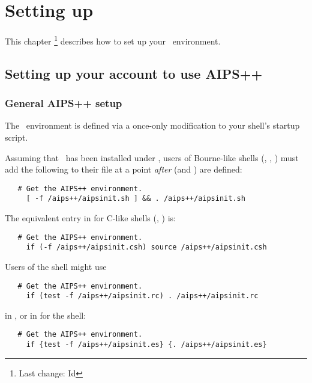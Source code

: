 \chapter{Setting up}
\label{Setting up}

This chapter \footnote{Last change:
$ $Id$ $}
describes how to set up your \aipspp\ environment.


\section{Setting up your account to use AIPS++}
\label{Setup}


\subsection{General AIPS++ setup}

The \aipspp\ environment is defined via a once-only modification to your
shell's startup script.

Assuming that \aipspp\ has been installed under , users of
Bourne-like shells (, , ) must add the
following to their  file at a point {\em after} 
(and ) are defined:

\begin{verbatim}
   # Get the AIPS++ environment.
     [ -f /aips++/aipsinit.sh ] && . /aips++/aipsinit.sh
\end{verbatim}

\noindent
The equivalent entry in  for C-like shells (,
) is:

\begin{verbatim}
   # Get the AIPS++ environment.
     if (-f /aips++/aipsinit.csh) source /aips++/aipsinit.csh
\end{verbatim}

\noindent
Users of the  shell might use

\begin{verbatim}
   # Get the AIPS++ environment.
     if (test -f /aips++/aipsinit.rc) . /aips++/aipsinit.rc
\end{verbatim}

\noindent
in , or in  for the  shell:

\begin{verbatim}
   # Get the AIPS++ environment.
     if {test -f /aips++/aipsinit.es} {. /aips++/aipsinit.es}
\end{verbatim}

